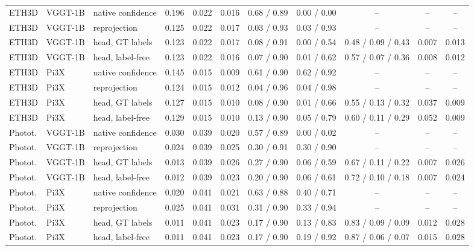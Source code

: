 \begin{tabular}{lll*{8}{c}}
ETH3D & VGGT-1B & native confidence & 0.196 & 0.022 & 0.016 & 0.68 / 0.89 & 0.00 / 0.00 & -- & -- & -- \\
ETH3D & VGGT-1B & reprojection & 0.125 & 0.022 & 0.017 & 0.03 / 0.93 & 0.03 / 0.93 & -- & -- & -- \\
ETH3D & VGGT-1B & head, GT labels & 0.123 & 0.022 & 0.017 & 0.08 / 0.91 & 0.00 / 0.54 & 0.48 / 0.09 / 0.43 & 0.007 & 0.013 \\
ETH3D & VGGT-1B & head, label-free & 0.123 & 0.022 & 0.016 & 0.07 / 0.90 & 0.01 / 0.62 & 0.57 / 0.07 / 0.36 & 0.008 & 0.012 \\
ETH3D & Pi3X & native confidence & 0.145 & 0.015 & 0.009 & 0.61 / 0.90 & 0.62 / 0.92 & -- & -- & -- \\
ETH3D & Pi3X & reprojection & 0.124 & 0.015 & 0.012 & 0.04 / 0.96 & 0.04 / 0.98 & -- & -- & -- \\
ETH3D & Pi3X & head, GT labels & 0.127 & 0.015 & 0.010 & 0.08 / 0.90 & 0.01 / 0.66 & 0.55 / 0.13 / 0.32 & 0.037 & 0.009 \\
ETH3D & Pi3X & head, label-free & 0.129 & 0.015 & 0.010 & 0.13 / 0.90 & 0.05 / 0.79 & 0.60 / 0.11 / 0.29 & 0.052 & 0.009 \\
Photot. & VGGT-1B & native confidence & 0.030 & 0.039 & 0.020 & 0.57 / 0.89 & 0.00 / 0.02 & -- & -- & -- \\
Photot. & VGGT-1B & reprojection & 0.024 & 0.039 & 0.025 & 0.30 / 0.91 & 0.30 / 0.90 & -- & -- & -- \\
Photot. & VGGT-1B & head, GT labels & 0.013 & 0.039 & 0.026 & 0.27 / 0.90 & 0.06 / 0.59 & 0.67 / 0.11 / 0.22 & 0.007 & 0.026 \\
Photot. & VGGT-1B & head, label-free & 0.012 & 0.039 & 0.023 & 0.20 / 0.90 & 0.06 / 0.61 & 0.72 / 0.10 / 0.18 & 0.007 & 0.024 \\
Photot. & Pi3X & native confidence & 0.020 & 0.041 & 0.021 & 0.63 / 0.88 & 0.40 / 0.71 & -- & -- & -- \\
Photot. & Pi3X & reprojection & 0.025 & 0.041 & 0.031 & 0.31 / 0.90 & 0.33 / 0.94 & -- & -- & -- \\
Photot. & Pi3X & head, GT labels & 0.011 & 0.041 & 0.023 & 0.17 / 0.90 & 0.13 / 0.83 & 0.83 / 0.09 / 0.09 & 0.012 & 0.028 \\
Photot. & Pi3X & head, label-free & 0.011 & 0.041 & 0.023 & 0.17 / 0.90 & 0.19 / 0.92 & 0.87 / 0.06 / 0.07 & 0.015 & 0.028 \\
\bottomrule
\end{tabular}
